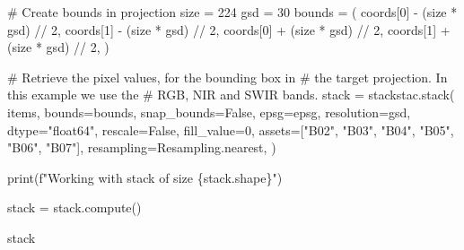 \documentclass[
  letterpaper,
  DIV=11,
  numbers=noendperiod]{scrreprt}
\newenvironment{Shaded}{\begin{snugshade}}{\end{snugshade}}
\newcommand{\BuiltInTok}[1]{\textcolor[rgb]{0.00,0.23,0.31}{#1}}
\newcommand{\CommentTok}[1]{\textcolor[rgb]{0.37,0.37,0.37}{#1}}
\newcommand{\DecValTok}[1]{\textcolor[rgb]{0.68,0.00,0.00}{#1}}
\newcommand{\NormalTok}[1]{\textcolor[rgb]{0.00,0.23,0.31}{#1}}
\newcommand{\OperatorTok}[1]{\textcolor[rgb]{0.37,0.37,0.37}{#1}}
\newcommand{\SpecialCharTok}[1]{\textcolor[rgb]{0.37,0.37,0.37}{#1}}
\newcommand{\SpecialStringTok}[1]{\textcolor[rgb]{0.13,0.47,0.30}{#1}}
\newcommand{\StringTok}[1]{\textcolor[rgb]{0.13,0.47,0.30}{#1}}
\newcommand{\VariableTok}[1]{\textcolor[rgb]{0.07,0.07,0.07}{#1}}
\begin{document}
\begin{Shaded}
\begin{Highlighting}[]
\CommentTok{\# Create bounds in projection}
\NormalTok{size }\OperatorTok{=} \DecValTok{224}
\NormalTok{gsd }\OperatorTok{=} \DecValTok{30}
\NormalTok{bounds }\OperatorTok{=}\NormalTok{ (}
\NormalTok{    coords[}\DecValTok{0}\NormalTok{] }\OperatorTok{{-}}\NormalTok{ (size }\OperatorTok{*}\NormalTok{ gsd) }\OperatorTok{//} \DecValTok{2}\NormalTok{,}
\NormalTok{    coords[}\DecValTok{1}\NormalTok{] }\OperatorTok{{-}}\NormalTok{ (size }\OperatorTok{*}\NormalTok{ gsd) }\OperatorTok{//} \DecValTok{2}\NormalTok{,}
\NormalTok{    coords[}\DecValTok{0}\NormalTok{] }\OperatorTok{+}\NormalTok{ (size }\OperatorTok{*}\NormalTok{ gsd) }\OperatorTok{//} \DecValTok{2}\NormalTok{,}
\NormalTok{    coords[}\DecValTok{1}\NormalTok{] }\OperatorTok{+}\NormalTok{ (size }\OperatorTok{*}\NormalTok{ gsd) }\OperatorTok{//} \DecValTok{2}\NormalTok{,}
\NormalTok{)}

\CommentTok{\# Retrieve the pixel values, for the bounding box in}
\CommentTok{\# the target projection. In this example we use the}
\CommentTok{\# RGB, NIR and SWIR bands.}
\NormalTok{stack }\OperatorTok{=}\NormalTok{ stackstac.stack(}
\NormalTok{    items,}
\NormalTok{    bounds}\OperatorTok{=}\NormalTok{bounds,}
\NormalTok{    snap\_bounds}\OperatorTok{=}\VariableTok{False}\NormalTok{,}
\NormalTok{    epsg}\OperatorTok{=}\NormalTok{epsg,}
\NormalTok{    resolution}\OperatorTok{=}\NormalTok{gsd,}
\NormalTok{    dtype}\OperatorTok{=}\StringTok{"float64"}\NormalTok{,}
\NormalTok{    rescale}\OperatorTok{=}\VariableTok{False}\NormalTok{,}
\NormalTok{    fill\_value}\OperatorTok{=}\DecValTok{0}\NormalTok{,}
\NormalTok{    assets}\OperatorTok{=}\NormalTok{[}\StringTok{"B02"}\NormalTok{, }\StringTok{"B03"}\NormalTok{, }\StringTok{"B04"}\NormalTok{, }\StringTok{"B05"}\NormalTok{, }\StringTok{"B06"}\NormalTok{, }\StringTok{"B07"}\NormalTok{],}
\NormalTok{    resampling}\OperatorTok{=}\NormalTok{Resampling.nearest,}
\NormalTok{)}

\BuiltInTok{print}\NormalTok{(}\SpecialStringTok{f"Working with stack of size }\SpecialCharTok{\{}\NormalTok{stack}\SpecialCharTok{.}\NormalTok{shape}\SpecialCharTok{\}}\SpecialStringTok{"}\NormalTok{)}

\NormalTok{stack }\OperatorTok{=}\NormalTok{ stack.compute()}

\NormalTok{stack}
\end{Highlighting}
\end{Shaded}
\end{document}

